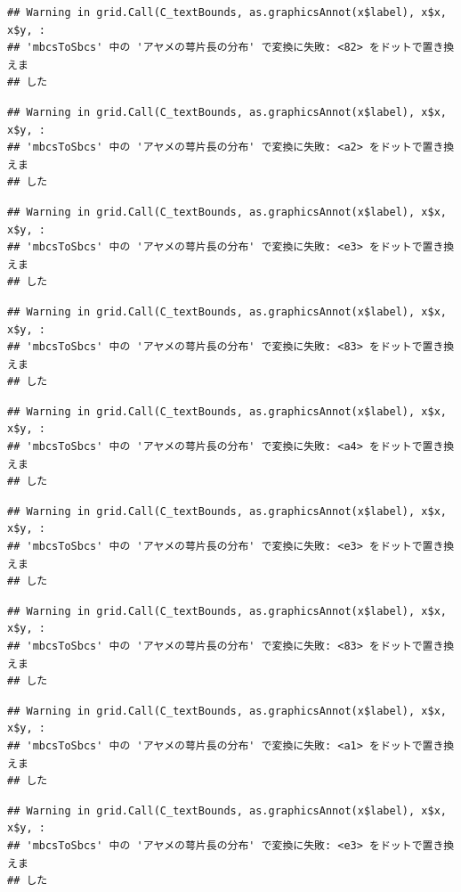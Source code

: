 \documentclass[
]{book}
\begin{document}
\begin{verbatim}
## Warning in grid.Call(C_textBounds, as.graphicsAnnot(x$label), x$x, x$y, :
## 'mbcsToSbcs' 中の 'アヤメの萼片長の分布' で変換に失敗: <82> をドットで置き換えま
## した
\end{verbatim}

\begin{verbatim}
## Warning in grid.Call(C_textBounds, as.graphicsAnnot(x$label), x$x, x$y, :
## 'mbcsToSbcs' 中の 'アヤメの萼片長の分布' で変換に失敗: <a2> をドットで置き換えま
## した
\end{verbatim}

\begin{verbatim}
## Warning in grid.Call(C_textBounds, as.graphicsAnnot(x$label), x$x, x$y, :
## 'mbcsToSbcs' 中の 'アヤメの萼片長の分布' で変換に失敗: <e3> をドットで置き換えま
## した
\end{verbatim}

\begin{verbatim}
## Warning in grid.Call(C_textBounds, as.graphicsAnnot(x$label), x$x, x$y, :
## 'mbcsToSbcs' 中の 'アヤメの萼片長の分布' で変換に失敗: <83> をドットで置き換えま
## した
\end{verbatim}

\begin{verbatim}
## Warning in grid.Call(C_textBounds, as.graphicsAnnot(x$label), x$x, x$y, :
## 'mbcsToSbcs' 中の 'アヤメの萼片長の分布' で変換に失敗: <a4> をドットで置き換えま
## した
\end{verbatim}

\begin{verbatim}
## Warning in grid.Call(C_textBounds, as.graphicsAnnot(x$label), x$x, x$y, :
## 'mbcsToSbcs' 中の 'アヤメの萼片長の分布' で変換に失敗: <e3> をドットで置き換えま
## した
\end{verbatim}

\begin{verbatim}
## Warning in grid.Call(C_textBounds, as.graphicsAnnot(x$label), x$x, x$y, :
## 'mbcsToSbcs' 中の 'アヤメの萼片長の分布' で変換に失敗: <83> をドットで置き換えま
## した
\end{verbatim}

\begin{verbatim}
## Warning in grid.Call(C_textBounds, as.graphicsAnnot(x$label), x$x, x$y, :
## 'mbcsToSbcs' 中の 'アヤメの萼片長の分布' で変換に失敗: <a1> をドットで置き換えま
## した
\end{verbatim}

\begin{verbatim}
## Warning in grid.Call(C_textBounds, as.graphicsAnnot(x$label), x$x, x$y, :
## 'mbcsToSbcs' 中の 'アヤメの萼片長の分布' で変換に失敗: <e3> をドットで置き換えま
## した
\end{verbatim}
\end{document}
